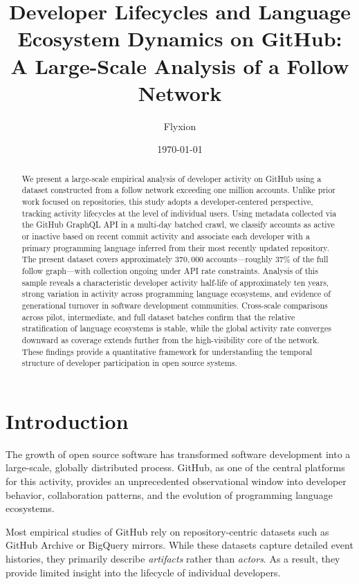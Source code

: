 \documentclass[12pt,a4paper]{article}
\title{Developer Lifecycles and Language Ecosystem Dynamics on GitHub:\\
A Large-Scale Analysis of a Follow Network}
\author{Flyxion}
\date{\today}
\begin{document}
\maketitle

\begin{abstract}
We present a large-scale empirical analysis of developer activity on GitHub using a dataset constructed from a follow network exceeding one million accounts. Unlike prior work focused on repositories, this study adopts a developer-centered perspective, tracking activity lifecycles at the level of individual users. Using metadata collected via the GitHub GraphQL API in a multi-day batched crawl, we classify accounts as active or inactive based on recent commit activity and associate each developer with a primary programming language inferred from their most recently updated repository. The present dataset covers approximately $370{,}000$ accounts---roughly $37\%$ of the full follow graph---with collection ongoing under API rate constraints. Analysis of this sample reveals a characteristic developer activity half-life of approximately ten years, strong variation in activity across programming language ecosystems, and evidence of generational turnover in software development communities. Cross-scale comparisons across pilot, intermediate, and full dataset batches confirm that the relative stratification of language ecosystems is stable, while the global activity rate converges downward as coverage extends further from the high-visibility core of the network. These findings provide a quantitative framework for understanding the temporal structure of developer participation in open source systems.
\end{abstract}

\newpage
\section{Introduction}

The growth of open source software has transformed software development into a large-scale, globally distributed process. GitHub, as one of the central platforms for this activity, provides an unprecedented observational window into developer behavior, collaboration patterns, and the evolution of programming language ecosystems.

Most empirical studies of GitHub rely on repository-centric datasets such as GitHub Archive or BigQuery mirrors. While these datasets capture detailed event histories, they primarily describe \emph{artifacts} rather than \emph{actors}. As a result, they provide limited insight into the lifecycle of individual developers.
\end{document}
